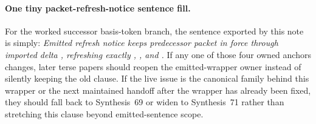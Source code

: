 \documentclass[11pt]{article}
\begin{document}
\paragraph{One tiny packet-refresh-notice sentence fill.}
For the worked successor basis-token branch, the sentence exported by this note is simply: \emph{Emitted refresh notice  keeps predecessor packet  in force through imported delta , refreshing exactly , , and .} If any one of those four owned anchors changes, later terse papers should reopen the emitted-wrapper owner instead of silently keeping the old clause. If the live issue is the canonical family behind this wrapper or the next maintained handoff after the wrapper has already been fixed, they should fall back to Synthesis~69 or widen to Synthesis~71 rather than stretching this clause beyond emitted-sentence scope.\cite{series:workedexample}
\end{document}
